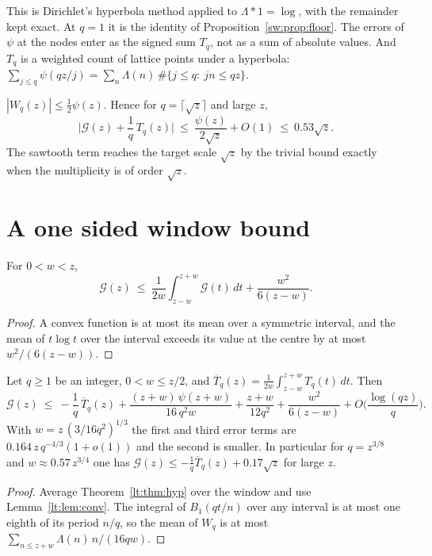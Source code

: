 This is Dirichlet's hyperbola method applied to $\Lambda*1=\log$, with the remainder kept exact. At $q=1$ it is the identity of Proposition~\ref{sw:prop:floor}. The errors of $\psi$ at the nodes enter as the signed sum $T_q$, not as a sum of absolute values. And $T_q$ is a weighted count of lattice points under a hyperbola: $\sum_{j\le q}\psi(qz/j)=\sum_n\Lambda(n)\,\#\{j\le q:\ jn\le qz\}$.

\begin{corollary}\label{lt:cor:sqrt}
$|W_q(z)|\le\tfrac12\psi(z)$. Hence for $q=\lceil\sqrt z\rceil$ and large $z$,
\[
\Big|\mathcal G(z)+\frac1q\,T_q(z)\Big|\ \le\ \frac{\psi(z)}{2\sqrt z}+O(1)\ \le\ 0.53\sqrt z .
\]
The sawtooth term reaches the target scale $\sqrt z$ by the trivial bound exactly when the multiplicity is of order $\sqrt z$.
\end{corollary}

\section{A one sided window bound}\label{lt:sec:win}

\begin{lemma}[Convexity]\label{lt:lem:conv}
For $0<w<z$,
\[
\mathcal G(z)\ \le\ \frac1{2w}\int_{z-w}^{z+w}\mathcal G(t)\,dt+\frac{w^2}{6(z-w)} .
\]
\end{lemma}

\begin{proof}
A convex function is at most its mean over a symmetric interval, and the mean of $t\log t$ over the interval exceeds its value at the centre by at most $w^2/(6(z-w))$.
\end{proof}

\begin{theorem}\label{lt:thm:win}
Let $q\ge1$ be an integer, $0<w\le z/2$, and $\overline T_q(z)=\frac1{2w}\int_{z-w}^{z+w}T_q(t)\,dt$. Then
\[
\mathcal G(z)\ \le\ -\frac1q\,\overline T_q(z)+\frac{(z+w)\,\psi(z+w)}{16\,q^2w}+\frac{z+w}{12q^2}+\frac{w^2}{6(z-w)}+O\Big(\frac{\log(qz)}q\Big).
\]
With $w=z\,(3/16q^2)^{1/3}$ the first and third error terms are $0.164\,z\,q^{-4/3}(1+o(1))$ and the second is smaller. In particular for $q=z^{3/8}$ and $w\approx0.57\,z^{3/4}$ one has $\mathcal G(z)\le-\frac1q\overline T_q(z)+0.17\sqrt z$ for large $z$.
\end{theorem}

\begin{proof}
Average Theorem~\ref{lt:thm:hyp} over the window and use Lemma~\ref{lt:lem:conv}. The integral of $B_1(qt/n)$ over any interval is at most one eighth of its period $n/q$, so the mean of $W_q$ is at most $\sum_{n\le z+w}\Lambda(n)\,n/(16qw)$.
\end{proof}

